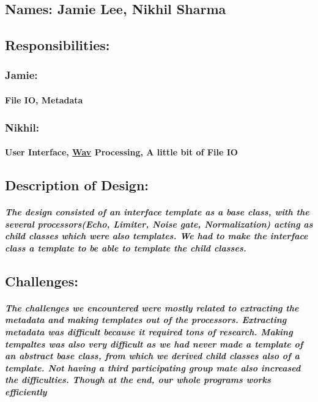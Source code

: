\subsection*{Names\+: Jamie Lee, Nikhil Sharma}

\subsection*{Responsibilities\+:}

\subsubsection*{Jamie\+:}

\paragraph*{File IO, Metadata}

\subsubsection*{Nikhil\+:}

\paragraph*{User Interface, \hyperlink{classWav}{Wav} Processing, A little bit of File IO}

\subsection*{Description of Design\+:}

\subparagraph*{The {\itshape design} consisted of an interface template as a base class, with the several processors(\+Echo, Limiter, Noise gate, Normalization) acting as child classes which were also templates. We had to make the interface class a template to be able to template the child classes.}

 \subsection*{Challenges\+:}

\subparagraph*{The {\itshape challenges} we encountered were mostly related to extracting the metadata and making templates out of the processors. Extracting metadata was difficult because it required tons of research. Making tempaltes was also very difficult as we had never made a template of an abstract base class, from which we derived child classes also of a template. {\bfseries Not} having a third participating group mate also increased the difficulties. {\itshape {\bfseries Though at the end, our whole programs works efficiently}}}